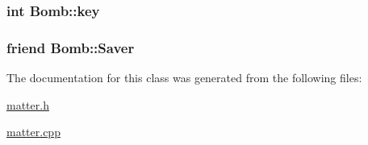 \subsubsection[{key}]{\setlength{\rightskip}{0pt plus 5cm}int Bomb\+::key\hspace{0.3cm}{\ttfamily [private]}}\label{classBomb_a726b2a3863e21ce6c727755455287ca9}
\hypertarget{classBomb_a658d93baafd7925c4bf86ec9a6888f7a}{}
\subsubsection[{Saver}]{\setlength{\rightskip}{0pt plus 5cm}friend Bomb\+::\+Saver\hspace{0.3cm}{\ttfamily [private]}}\label{classBomb_a658d93baafd7925c4bf86ec9a6888f7a}


The documentation for this class was generated from the following files\+:\begin{DoxyCompactItemize}
\item 
\hyperlink{matter_8h}{matter.\+h}\item 
\hyperlink{matter_8cpp}{matter.\+cpp}\end{DoxyCompactItemize}
